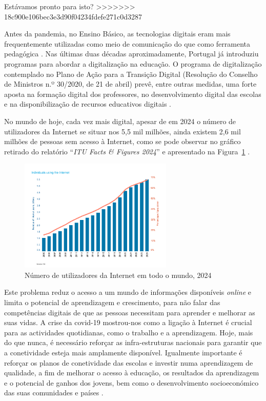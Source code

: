 Estávamos pronto para isto?
>>>>>>> 18c900e106bec3e3d90f04234fdefe271c0d3287

Antes da pandemia, no Ensino Básico, as tecnologias digitais eram mais frequentemente utilizadas como meio de comunicação do que como ferramenta pedagógica \cite{oecd_using_2021}. Nas últimas duas décadas aproximadamente, Portugal já introduziu programas para abordar a digitalização na educação. O programa de digitalização contemplado no Plano de Ação para a Transição Digital (Resolução do Conselho de Ministros n.º 30/2020, de 21 de abril) prevê, entre outras medidas, uma forte aposta na formação digital dos professores, no desenvolvimento digital das escolas e na disponibilização de recursos educativos digitais \cite{transicaodigital, capacitacaodigital}.

No mundo de hoje, cada vez mais digital, apesar de em 2024 o número de utilizadores da Internet se situar nos 5,5 mil milhões, ainda existem 2,6 mil milhões de pessoas sem acesso à Internet, como se pode observar no gráfico retirado do relatório ``\textit{ITU Facts \& Figures 2024}'' e apresentado na Figura~\ref{fig:numutilizadoresnet} \cite{broadbandcomission, itu2024facts}.

\begin{figure}[hbtp]
    \centering
    \includegraphics[width=0.65\textwidth]{figures/ITU-InternetUse.png}
    \caption{Número de utilizadores da Internet em todo o mundo, 2024 \cite{itu2024facts}}
    \label{fig:numutilizadoresnet}
\end{figure}
Este problema reduz o acesso a um mundo de informações disponíveis \textit{online} e limita o potencial de aprendizagem e crescimento, para não falar das competências digitais de que as pessoas necessitam para aprender e melhorar as suas vidas.
A crise da \acrshort{covid-19} mostrou-nos como a ligação à Internet é crucial para as actividades quotidianas, como o trabalho e a aprendizagem. Hoje, mais do que nunca, é necessário reforçar as infra-estruturas nacionais para garantir que a conetividade esteja mais amplamente disponível. Igualmente importante é reforçar os planos de conetividade das escolas e investir numa aprendizagem de qualidade, a fim de melhorar o acesso à educação, os resultados da aprendizagem e o potencial de ganhos dos jovens, bem como o desenvolvimento socioeconómico das suas comunidades e países \cite{TheDigitransf}.

